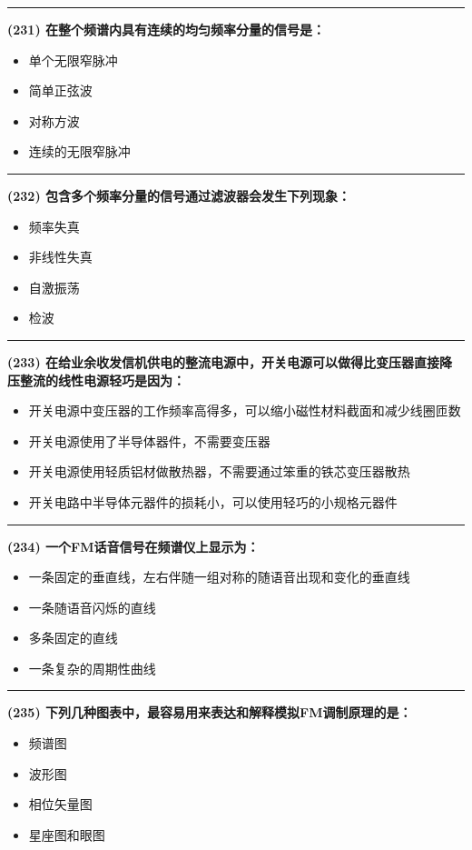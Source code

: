 \documentclass[twocolumn]{ctexart}  %
\begin{document}
\noindent\rule{0.5\textwidth}{1pt}
\heiti \textbf{(231) 在整个频谱内具有连续的均匀频率分量的信号是：} \songti {\color{gray} [LK0536] }
\begin{itemize}
	\item  单个无限窄脉冲
	\item  简单正弦波
	\item  对称方波
	\item  连续的无限窄脉冲
\end{itemize}


\noindent\rule{0.5\textwidth}{1pt}
\heiti \textbf{(232) 包含多个频率分量的信号通过滤波器会发生下列现象：} \songti {\color{gray} [LK0572] }
\begin{itemize}
	\item  频率失真
	\item  非线性失真
	\item  自激振荡
	\item  检波
\end{itemize}


\noindent\rule{0.5\textwidth}{1pt}
\heiti \textbf{(233) 在给业余收发信机供电的整流电源中，开关电源可以做得比变压器直接降压整流的线性电源轻巧是因为：} \songti {\color{gray} [LK0689] }
\begin{itemize}
	\item  开关电源中变压器的工作频率高得多，可以缩小磁性材料截面和减少线圈匝数
	\item  开关电源使用了半导体器件，不需要变压器
	\item  开关电源使用轻质铝材做散热器，不需要通过笨重的铁芯变压器散热
	\item  开关电路中半导体元器件的损耗小，可以使用轻巧的小规格元器件
\end{itemize}


\noindent\rule{0.5\textwidth}{1pt}
\heiti \textbf{(234) 一个FM话音信号在频谱仪上显示为：} \songti {\color{gray} [LK0713] }
\begin{itemize}
	\item  一条固定的垂直线，左右伴随一组对称的随语音出现和变化的垂直线
	\item  一条随语音闪烁的直线
	\item  多条固定的直线
	\item  一条复杂的周期性曲线
\end{itemize}


\noindent\rule{0.5\textwidth}{1pt}
\heiti \textbf{(235) 下列几种图表中，最容易用来表达和解释模拟FM调制原理的是：} \songti {\color{gray} [LK0716] }
\begin{itemize}
	\item  频谱图
	\item  波形图
	\item  相位矢量图
	\item  星座图和眼图
\end{itemize}
\end{document}

